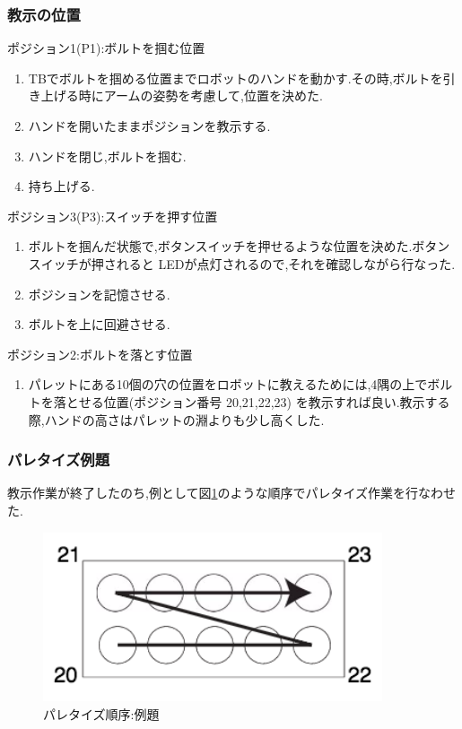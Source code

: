 \documentclass[a4paper,11pt]{jsarticle}
\begin{document}
\subsubsection{教示の位置}
ポジション1(P1):ボルトを掴む位置
\begin{enumerate}
  \item TBでボルトを掴める位置までロボットのハンドを動かす.その時,ボルトを引き上げる時にアームの姿勢を考慮して,位置を決めた.
  \item ハンドを開いたままポジションを教示する.
  \item ハンドを閉じ,ボルトを掴む.
  \item 持ち上げる.
\end{enumerate}
ポジション3(P3):スイッチを押す位置
\begin{enumerate}
  \item ボルトを掴んだ状態で,ボタンスイッチを押せるような位置を決めた.ボタンスイッチが押されると
  LEDが点灯されるので,それを確認しながら行なった.
  \item ポジションを記憶させる.
  \item ボルトを上に回避させる.
\end{enumerate}
ポジション2:ボルトを落とす位置
\begin{enumerate}
  \item パレットにある10個の穴の位置をロボットに教えるためには,4隅の上でボルトを落とせる位置(ポジション番号 20,21,22,23)
  を教示すれば良い.教示する際,ハンドの高さはパレットの淵よりも少し高くした.
\end{enumerate}

\subsubsection{パレタイズ例題}
教示作業が終了したのち,例として図\ref{パレタイズ例}のような順序でパレタイズ作業を行なわせた.
\begin{figure}[H]
  \begin{center}
    \includegraphics[width = 10cm]{画像/パレタイズ順序例.png}
    \caption{パレタイズ順序:例題}
    \label{パレタイズ例}
  \end{center}
\end{figure}
\end{document}
